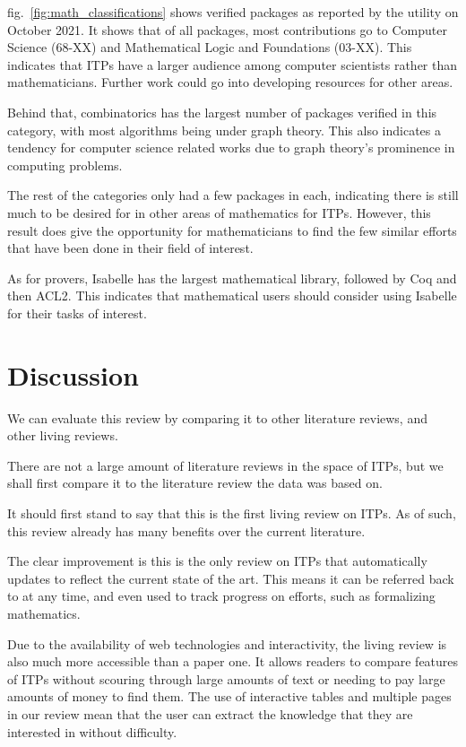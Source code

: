 \documentclass[
]{article}
\begin{document}
fig.~\ref{fig:math_classifications} shows verified packages as reported
by the utility on October 2021. It shows that of all packages, most
contributions go to Computer Science (68-XX) and Mathematical Logic and
Foundations (03-XX). This indicates that ITPs have a larger audience
among computer scientists rather than mathematicians. Further work could
go into developing resources for other areas.

Behind that, combinatorics has the largest number of packages verified
in this category, with most algorithms being under graph theory. This
also indicates a tendency for computer science related works due to
graph theory's prominence in computing problems.

The rest of the categories only had a few packages in each, indicating
there is still much to be desired for in other areas of mathematics for
ITPs. However, this result does give the opportunity for mathematicians
to find the few similar efforts that have been done in their field of
interest.

As for provers, Isabelle has the largest mathematical library, followed
by Coq and then ACL2. This indicates that mathematical users should
consider using Isabelle for their tasks of interest.

\hypertarget{discussion}{%
\section{Discussion}\label{discussion}}

We can evaluate this review by comparing it to other literature reviews,
and other living reviews.

There are not a large amount of literature reviews in the space of ITPs,
but we shall first compare it to the literature review the data was
based on.

It should first stand to say that this is the first living review on
ITPs. As of such, this review already has many benefits over the current
literature.

The clear improvement is this is the only review on ITPs that
automatically updates to reflect the current state of the art. This
means it can be referred back to at any time, and even used to track
progress on efforts, such as formalizing mathematics.

Due to the availability of web technologies and interactivity, the
living review is also much more accessible than a paper one. It allows
readers to compare features of ITPs without scouring through large
amounts of text or needing to pay large amounts of money to find them.
The use of interactive tables and multiple pages in our review mean that
the user can extract the knowledge that they are interested in without
difficulty.
\end{document}
